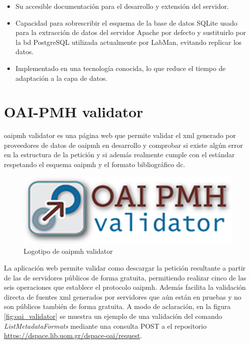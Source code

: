 \begin{itemize}
	\item Su accesible documentación para el desarrollo y extensión del servidor.
	\item Capacidad para sobrescribir el esquema de la base de datos SQLite usado para la extracción de datos del servidor Apache por defecto y sustituirlo por la \acrshort{bd} PostgreSQL utilizada actualmente por LabMan, evitando replicar los datos.
	\item Implementado en una tecnología conocida, lo que reduce el tiempo de adaptación a la capa de datos.
\end{itemize}

\section{OAI-PMH validator}

\acrshort{oaipmh} validator\cite{oaipmh_validator} es una página web que permite validar el \acrshort{xml} generado por proveedores de datos de \acrshort{oaipmh} en desarrollo y comprobar si existe algún error en la estructura de la petición y si además realmente cumple con el estándar respetando el esquema \acrshort{oaipmh} y el formato bibliográfico \acrshort{dc}.


\begin{figure}[!htbp]
	\centering
	\includegraphics[scale=0.5]{fig/oaipmh_validator_logo}
	\caption{Logotipo de \acrshort{oaipmh} validator}
\end{figure}

La aplicación web permite validar como descargar la petición resultante a partir de las  de servidores públicos de forma gratuita, permitiendo realizar cinco de las seis operaciones que establece el protocolo \acrshort{oaipmh}. Además facilita la validación directa de fuentes \acrshort{xml} generados por servidores que aún están en pruebas y no son públicos también de forma gratuita. A modo de aclaración, en la figura \ref{fig:oai_validator} se muestra un ejemplo de una validación del comando \textit{ListMetadataFormats} mediante una consulta POST a el repositorio \url{https://dspace.lib.uom.gr/dspace-oai/request}.


